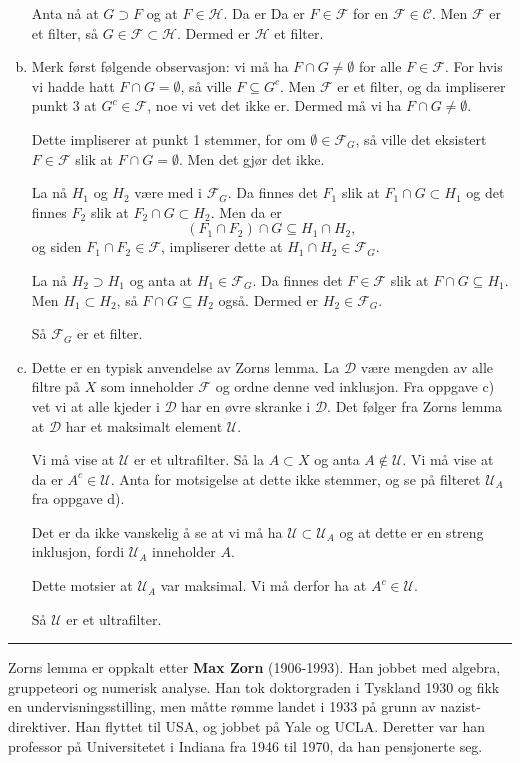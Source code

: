 \documentclass[11pt, norsk]{article}
\begin{document}
\begin{enumerate}[a)]
Anta nå at $G \supset F$ og at $F \in \mathcal H$. Da er Da er $F \in \mathcal F$ for en $\mathcal F \in \mathscr C$. Men $\mathcal F$ er et filter, så $G \in \mathcal F \subset \mathcal H$. Dermed er $\mathcal H$ et filter.

\item Merk først følgende observasjon: vi må ha $F \cap G \neq \emptyset$ for alle $F \in \mathcal F$. For hvis vi hadde hatt $F \cap G = \emptyset$, så ville $F \subseteq G^c$. Men $\mathcal F$ er et filter, og da impliserer punkt 3 at $G^c \in \mathcal F$, noe vi vet det ikke er. Dermed må vi ha $F \cap G \neq \emptyset$. 

Dette impliserer at punkt 1 stemmer, for om $\emptyset \in \mathcal F_G$, så ville det eksistert $F \in \mathcal F$ slik at $F \cap G = \emptyset$. Men det gjør det ikke.

La nå $H_1$ og $H_2$ være med i $\mathcal F_G$. Da finnes det $F_1$ slik at $F_1 \cap G \subset H_1$ og det finnes $F_2$ slik at $F_2 \cap G \subset H_2$. Men da er 
$$
(F_1 \cap F_2) \cap G \subseteq H_1 \cap H_2,
$$
og siden $F_1 \cap F_2 \in \mathcal F$, impliserer dette at $H_1 \cap H_2 \in \mathcal F_G$. 

La nå $H_2 \supset H_1$ og anta at $H_1 \in \mathcal F_G$. Da finnes det $F \in \mathcal F$ slik at $F \cap G \subseteq H_1$. Men $H_1 \subset H_2$, så $F \cap G \subseteq H_2$ også. Dermed er $H_2 \in \mathcal F_G$.

Så $\mathcal F_G$ er et filter.
\item Dette er en typisk anvendelse av Zorns lemma. La $\mathscr D$ være mengden av alle filtre på $X$ som inneholder $\mathcal F$ og ordne denne ved inklusjon. Fra oppgave c) vet vi at alle kjeder i $\mathscr D$ har en øvre skranke i $\mathscr D$. Det følger fra Zorns lemma at $\mathscr D$ har et maksimalt element $\mathscr U$.

Vi må vise at $\mathscr U$ er et ultrafilter. Så la $A \subset X$ og anta $A \not \in \mathscr U$. Vi må vise at da er $A^c \in \mathscr U$. Anta for motsigelse at dette ikke stemmer, og se på filteret $\mathscr U_A$ fra oppgave d).

Det er da ikke vanskelig å se at vi må ha $\mathscr U \subset \mathscr U_A$ og at dette er en streng inklusjon, fordi $\mathscr U_A$ inneholder $A$. 

Dette motsier at $\mathscr U_A$ var maksimal. Vi må derfor ha at $A^c \in \mathscr U$.

Så $\mathscr U$ er et ultrafilter.
\end{enumerate}

\rule{\textwidth}{1pt}

\begin{shaded}
Zorns lemma er oppkalt etter \textbf{Max Zorn} (1906-1993). Han jobbet med algebra, gruppeteori og numerisk analyse. Han tok doktorgraden i Tyskland 1930 og fikk en undervisningsstilling, men måtte rømme landet i 1933 på grunn av nazist-direktiver. Han flyttet til USA, og jobbet på Yale og UCLA. Deretter var han professor på Universitetet i Indiana fra 1946 til 1970, da han pensjonerte seg. 
\end{shaded} 
\end{document}
